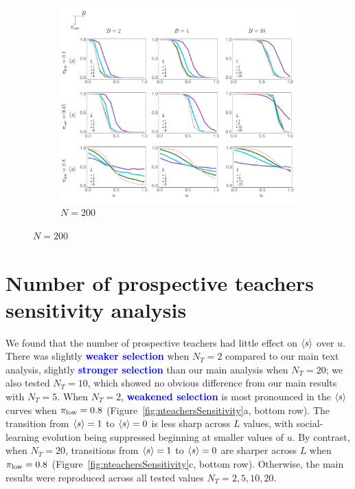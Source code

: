 \documentclass[letterpaper,11.5pt]{scrartcl}
\newcommand{\edit}[1]{{\bfseries \textcolor{blue} {#1}}}
\begin{document}
\begin{figure}
  \ContinuedFloat
	\begin{subfigure}{\textwidth}
	  \caption{$N=200$}
	  \includegraphics[width=\textwidth]{Figures/supplement/numagents=200/mainResultsPlots.pdf}
	\end{subfigure}
\end{figure}


\clearpage

\section{Number of prospective teachers sensitivity analysis}

We found that the number of prospective teachers had little effect on $\langle s \rangle$
over $u$. There was slightly \edit{weaker selection} when $N_T = 2$ compared to our 
main text analysis, slightly \edit{stronger selection} than our main analysis when $N_T = 20$; 
we also tested $N_T=10$, which showed no obvious difference from our main results
with $N_T = 5$. When $N_T = 2$, \edit{weakened selection} is most pronounced in the
$\langle s \rangle$ curves when $\pi_{\mathrm{low}}=0.8$ (Figure~\ref{fig:nteachersSensitivity}a, 
bottom row). The transition from $\langle s \rangle = 1$ to $\langle s \rangle = 0$ is less sharp
across $L$ values, with social-learning evolution being suppressed beginning
at smaller values of $u$. By contrast, when $N_T = 20$, transitions from 
$\langle s \rangle = 1$ to $\langle s \rangle = 0$ are sharper across $L$ when $\pi_{\mathrm{low}} = 0.8$
(Figure~\ref{fig:nteachersSensitivity}c, bottom row). Otherwise, the main 
results were reproduced across all tested values $N_T=2,5,10,20$.
\end{document}
